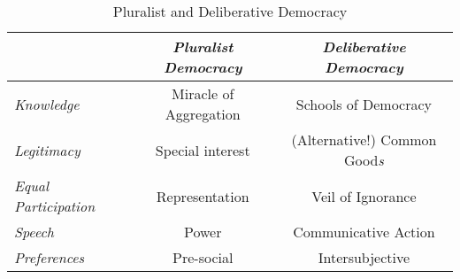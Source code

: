 
\begin{table}
	\caption{Pluralist and Deliberative Democracy}
	\label{tab:pluralist-vs-deliberative}
	\small
	\begin{center}
	\begin{tabular}{lcc}
		\toprule
		 & \emph{Pluralist Democracy} & \emph{Deliberative Democracy}\\
		\midrule
		\emph{Knowledge} & Miracle of Aggregation & Schools of Democracy \\ [10pt]
		\emph{Legitimacy} & Special interest & (Alternative!) Common Good\emph{s} \\ [10pt]
		\emph{Equal Participation} & Representation & Veil of Ignorance \\ [10pt]
		\emph{Speech} & Power & Communicative Action \\ [10pt]
		\emph{Preferences} & Pre-social & Intersubjective\\
		\bottomrule
	\end{tabular}
	\end{center}
\end{table}